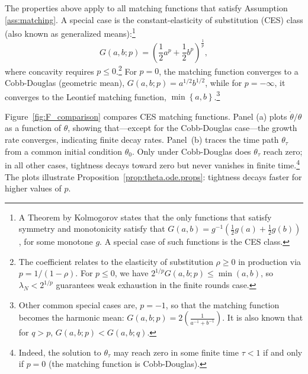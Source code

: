 \documentclass[12pt,american,english,notitlepage]{article}
\begin{document}
The properties above apply to all matching functions that satisfy Assumption \ref{ass:matching}. A special case is the constant-elasticity of substitution (CES) class (also
known as generalized means):\footnote{A Theorem by Kolmogorov states that the only functions that satisfy
symmetry and monotonicity satisfy that $G\left(a,b\right)=g^{-1}\left(\frac{1}{2}g\left(a\right)+\frac{1}{2}g\left(b\right)\right)$, for some monotone $g$.
A special case of such functions is the CES class.}
\[
G\left(a,b;p\right)=\left(\frac{1}{2}a^{p}+\frac{1}{2}b^{p}\right)^\frac{1}{p},
\]
where concavity requires $p\leq0$.\footnote{
The coefficient relates to the elasticity of substitution $\rho\geq0$
in production via $p=1/\left(1-\rho\right)$. For $p\leq0$, we have
$2^{1/p}G\left(a,b;p\right)\leq\min\left(a,b\right)$, so $\lambda_{N}<2^{1/p}$
guarantees weak exhaustion in the finite rounds case.} For $p=0$, the matching
function converges to a Cobb-Douglas (geometric mean), $G\left(a,b;p\right)=a^{1/2}b^{1/2}$,
while for $p=-\infty$, it converges to the Leontief matching function,
$\min\left\{ a,b\right\} $.\footnote{
Other common special cases are, $p=-1$, so that the matching function
becomes the harmonic mean: $G\left(a,b;p\right)=2\left(\frac{1}{a^{-1}+b^{-1}}\right).$
It is also known that for $q>p$, $G\left(a,b;p\right)<G\left(a,b;q\right)$.}

Figure~\ref{fig:F_comparison} compares CES matching functions. Panel (a) plots $\dot{\theta}/\theta$ as a function of $\theta$, showing that---except for the Cobb-Douglas case---the growth rate converges, indicating finite decay rates. Panel~(b) traces the time path $\theta_{\tau}$ from a common initial condition $\theta_0$. Only under Cobb-Douglas does $\theta_{\tau}$ reach zero; in all other cases, tightness decays toward zero but never vanishes in finite time.\footnote{Indeed, the solution to $\theta_{\tau}$ may reach zero in some finite time $\tau<1$ if and only if $p=0$ (the matching function is Cobb-Douglas).}
The plots illustrate Proposition~\ref{prop:theta.ode.props}: tightness decays faster for higher values of $p$.
\end{document}
